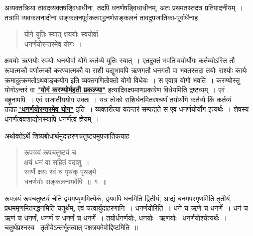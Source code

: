 \documentclass[11pt, openany]{book}
\begin{document}
\vspace{-3mm}
 अव्यक्तक्रिया तावदव्यक्तषड्विधाधीना, तदपि धनर्णषड्विधाधीनम्, अतः 
प्रथमतस्तदत्र प्रतिपादनीयम्~। तत्रापि व्यवकलनादीनां
सङ्कलनपूर्वकत्वाद्धनर्णसङ्कलनं तावदुपजातिका-पूर्वार्धेनाह\textendash 

 \label{1.3.1}
\begin{quote}
    \bs
     योगे युतिः स्यात् क्षययोः स्वयोर्वा \\

\vspace{-7mm}
\hspace{1cm} धनर्णयोरन्तरमेव योगः~। 
\end{quote}

 क्षययोः ऋणयोः स्वयोः धनयोर्वा योगे कर्तव्ये युतिः स्यात्~। एतदुक्तं 
भवति\textendash \,ययोर्योगः कर्तव्योऽस्ति तौ रूपात्मकौ वर्णात्मकौ
करण्यात्मकौ वा राशी यद्युभावपि ऋणगतौ धनगतौ वा भवतस्तदा तयोः राश्योः कार्यः क्रमादुत्क्रमतोऽथवाङ्कयोग इति व्यक्तगणितोक्तो योगो विधेयः~। स एवात्र योगो भवति~। करण्योस्तु योगोऽन्तरं वा \hyperref[1.12.1]{\textbf{"योगं करण्योर्महती प्रकल्प्या"}} 
इत्यादिवक्ष्यमाणप्रकारेण विधेयमिति द्रष्टव्यम्~। एवं बहूनामपि~। एवं सजातीययोग 
उक्तः~। यत्र त्वेको राशिर्धनमितरश्चर्णं तयोर्योगे कर्तव्ये किं कर्तव्यं
तदाह\textendash \,\hyperref[1.3.1]{\textbf{"धनर्णयोरन्तरमेव योग"}} इति~। व्यक्तरीत्या यदन्तरं सम्पद्यते स एव धनर्णयोर्योग इत्यर्थः~। शेषस्य धनर्णत्ववशाद्योगस्यापि धनर्णत्वं ज्ञेयम्~।
\newpage

 अथोक्तेऽर्थे शिष्यबोधार्थमुदाहरणचतुष्टयमुपजातिकयाह\textendash 
\begin{quote}
    \ex
 रूपत्रयं रूपचतुष्टयं च \\

\vspace{-7mm}
\hspace{1cm} क्षयं धनं वा सहितं वदाशु~। \\

 \vspace{-7mm}
 स्वर्णे क्षयः स्वं च पृथक् पृथङ्मे \\

\vspace{-7mm}
\hspace{1cm} धनर्णयोः सङ्कलनामवैषि~॥~१~॥
\end{quote}
 
 रूपत्रयं रूपचतुष्टयं चेति द्वयमप्यृणमित्येकं, द्वयमपि धनमिति द्वितीयं,
आद्यं धनमपरमृणमिति तृतीयं, प्रथममृणमितरद्धनमिति चतुर्थम्, एवं 
चत्वार्युदाहरणानि~। धनर्णयोरिति~। धने च ऋणे च धनर्णे~। धनं 
च ऋणं च धनर्णं, धनर्णं च धनर्णं च धनर्णे~। तयोर्धनर्णयोः, 
धनयोः ~ऋणयोः ~धनर्णयोश्चेत्यर्थः~। चतुर्थप्रश्नस्य ~तृतीयेऽन्तर्भूतत्वात् पक्षत्रयमेवोद्दिष्टमिति~॥ \\
\end{document}
